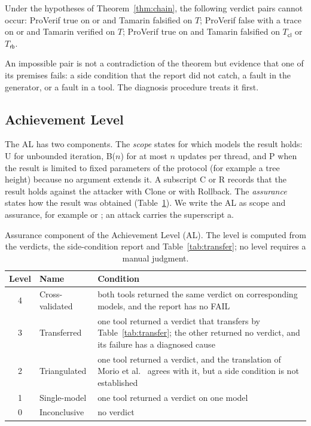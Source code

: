 \begin{Corollary}\label{cor:imp}
Under the hypotheses of Theorem~\ref{thm:chain}, the following verdict pairs cannot occur: ProVerif true on \PVlin or \PVrep and Tamarin falsified on $T$; ProVerif false with a trace on  or \PVlin and Tamarin verified on $T$; ProVerif true on \PVrep and Tamarin falsified on $T_{\mathsf{cl}}$ or $T_{\mathsf{rb}}$.
\end{Corollary}

An impossible pair is not a contradiction of the theorem but evidence that one of its premises fails: a side condition that the report did not catch, a fault in the generator, or a fault in a tool. The diagnosis procedure treats it first.

\subsection{Achievement Level}\label{sec:method:al}

The AL has two components. The \emph{scope} states for which models the result holds: U for unbounded iteration, B($n$) for at most $n$ updates per thread, and P when the result is limited to fixed parameters of the protocol (for example a tree height) because no argument extends it. A subscript C or R records that the result holds against the attacker with Clone or with Rollback. The \emph{assurance} states how the result was obtained (Table~\ref{tab:al}). We write the AL as scope and assurance, for example  or ; an attack carries the superscript a.

\begin{table}[H]
\caption{Assurance component of the Achievement Level (AL). The level is computed from the verdicts, the side-condition report and Table~\ref{tab:transfer}; no level requires a manual judgment.\label{tab:al}}
\small
\begin{tabularx}{\textwidth}{@{}clX@{}}
\toprule
\textbf{Level} & \textbf{Name} & \textbf{Condition} \\
\midrule
4 & Cross-validated & both tools returned the same verdict on corresponding models, and the report has no FAIL \\
3 & Transferred & one tool returned a verdict that transfers by Table~\ref{tab:transfer}; the other returned no verdict, and its failure has a diagnosed cause \\
2 & Triangulated & one tool returned a verdict, and the translation of Morio et al.~\cite{Morio2026CCS} agrees with it, but a side condition is not established \\
1 & Single-model & one tool returned a verdict on one model \\
0 & Inconclusive & no verdict \\
\bottomrule
\end{tabularx}
\end{table}

